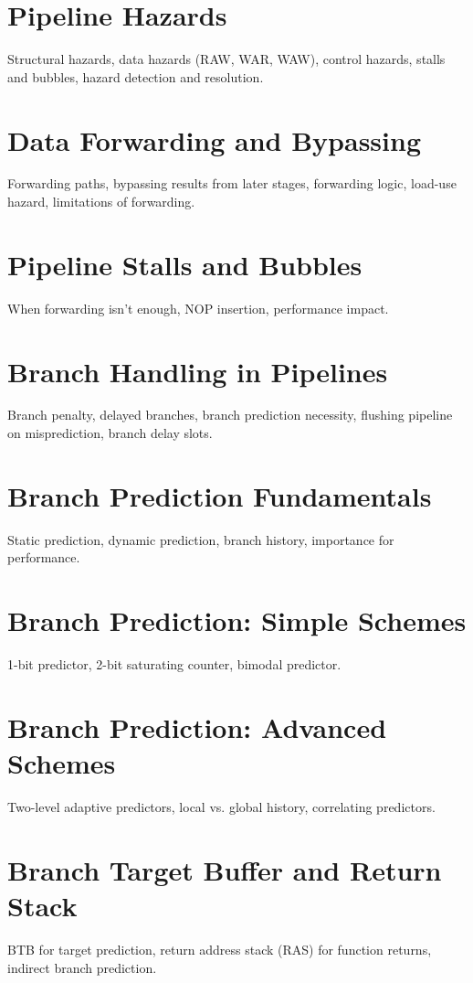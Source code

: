 \chapter{Pipeline Hazards}
Structural hazards, data hazards (RAW, WAR, WAW), control hazards, stalls and bubbles, hazard detection and resolution.

\chapter{Data Forwarding and Bypassing}
Forwarding paths, bypassing results from later stages, forwarding logic, load-use hazard, limitations of forwarding.

\chapter{Pipeline Stalls and Bubbles}
When forwarding isn't enough, NOP insertion, performance impact.

\chapter{Branch Handling in Pipelines}
Branch penalty, delayed branches, branch prediction necessity, flushing pipeline on misprediction, branch delay slots.

\chapter{Branch Prediction Fundamentals}
Static prediction, dynamic prediction, branch history, importance for performance.

\chapter{Branch Prediction: Simple Schemes}
1-bit predictor, 2-bit saturating counter, bimodal predictor.

\chapter{Branch Prediction: Advanced Schemes}
Two-level adaptive predictors, local vs. global history, correlating predictors.

\chapter{Branch Target Buffer and Return Stack}
BTB for target prediction, return address stack (RAS) for function returns, indirect branch prediction.

